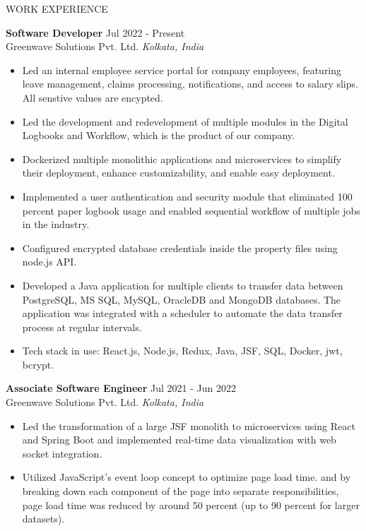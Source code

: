 \documentclass{resume} %
\begin{document}
\begin{rSection}{WORK EXPERIENCE}

\textbf{Software Developer} \hfill Jul 2022 - Present\\
Greenwave Solutions Pvt. Ltd. \hfill \textit{Kolkata, India}
 \begin{itemize}
    \itemsep -5pt {} 
    \item Led an internal employee service portal for company employees, featuring leave management, claims processing, notifications, and access to salary slips. All senstive values are encypted.
     \item Led the development and redevelopment of multiple modules in the Digital Logbooks and Workflow, which is the product of our company.
     \item Dockerized multiple monolithic applications and microservices to simplify their deployment, enhance customizability, and enable easy deployment.
     \item Implemented a user authentication and security module that eliminated 100 percent paper logbook usage and enabled sequential workflow of multiple jobs in the industry.
     \item Configured encrypted database credentials inside the property files using node.js API.
     \item Developed a Java application for multiple clients to transfer data between PostgreSQL, 
MS SQL, MySQL, OracleDB and MongoDB databases. The application was integrated with a scheduler to 
automate the data transfer process at regular intervals.

    \item Tech stack in use: React.js, Node.js, Redux, Java, JSF, SQL, Docker, jwt, bcrypt.
 \end{itemize}
 
\textbf{Associate Software Engineer} \hfill Jul 2021 - Jun 2022\\
Greenwave Solutions Pvt. Ltd. \hfill \textit{Kolkata, India}
 \begin{itemize}
    \itemsep -3pt {} 
     \item Led the transformation of a large JSF monolith to microservices using React and Spring Boot
    and implemented real-time data visualization with web socket integration.
\item Utilized JavaScript's event loop concept to optimize page load time.
and by breaking down each component of the page into separate responsibilities, page load time was reduced by around 50 percent (up to 90 percent for larger datasets).


\end{itemize}
\end{rSection}
\end{document}
